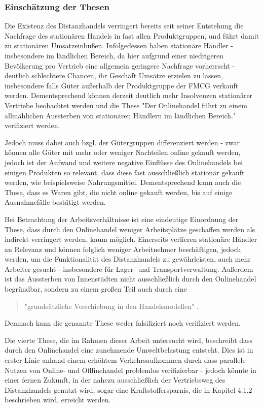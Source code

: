 \documentclass[a4paper, 12pt]{scrartcl}
\begin{document}
    
    
     
\subsubsection{Einschätzung der Thesen}

Die Existenz des Distanzhandels verringert bereits seit seiner Entstehung die Nachfrage des stationären Handels in fast allen Produktgruppen, und führt damit zu stationären Umsatzeinbußen. Infolgedessen haben stationäre Händler - insbesondere im ländlichen Bereich, da hier aufgrund einer niedrigeren Bevölkerung pro Vertrieb eine allgemein geringere Nachfrage vorherrscht - deutlich schlechtere Chancen, ihr Geschäft Umsätze erzielen zu lassen, insbesondere falls Güter außerhalb der Produktgruppe der \ac{FMCG} verkauft werden. Dementsprechend können derzeit deutlich mehr Insolvenzen stationärer Vertriebe beobachtet werden und die These "Der Onlinehandel führt zu einem allmählichen Aussterben von stationären Händlern im ländlichen Bereich." verifiziert werden.

Jedoch muss dabei auch bzgl. der Gütergruppen differenziert werden - zwar können alle Güter mit mehr oder weniger Nachteilen online gekauft werden, jedoch ist der Aufwand und weitere negative Einflüsse des Onlinehandels bei einigen Produkten so relevant, dass diese fast ausschließlich stationär gekauft werden, wie beispielsweise Nahrungsmittel. Dementsprechend kann auch die These, dass es Waren gibt, die nicht online gekauft werden, bis auf einige Ausnahmefälle bestätigt werden.

Bei Betrachtung der Arbeitsverhältnisse ist eine eindeutige Einordnung der These, dass durch den Onlinehandel weniger Arbeitsplätze geschaffen werden als indirekt verringert werden, kaum möglich. Einerseits verlieren stationäre Händler an Relevanz und können folglich weniger Arbeitnehmer beschäftigen, jedoch werden, um die Funktionalität des Distanzhandels zu gewährleisten, auch mehr Arbeiter gesucht - insbesondere für Lager- und Transportverwaltung. Außerdem ist das Aussterben von Innenstädten nicht ausschließlich durch den Onlinehandel begründbar, sondern zu einem großen Teil auch durch eine 
\begin{quote}
"grundsätzliche Verschiebung in den Handelsmodellen" \cite[S. 24]{evilcom}.
\end{quote}
Demnach kann die genannte These weder falsifiziert noch verifiziert werden.

Die vierte These, die im Rahmen dieser Arbeit untersucht wird, beschreibt dass durch den Onlinehandel eine zunehmende Umweltbelastung entsteht. Dies ist in erster Linie anhand einem erhöhtem Verkehrsaufkommen durch dass parallele Nutzen von Online- und Offlinehandel problemlos verifizierbar - jedoch könnte in einer fernen Zukunft, in der nahezu ausschließlich der Vertriebsweg des Distanzhandels genutzt wird, sogar eine Kraftstoffersparnis, die in Kapitel 4.1.2 beschrieben wird, erreicht werden.
\end{document}
